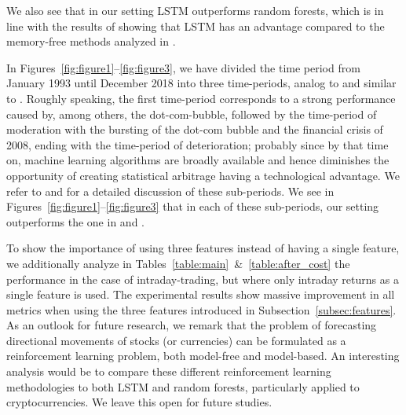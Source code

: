 \documentclass[review]{elsarticle}
\begin{document}
We also see that in our setting LSTM outperforms random forests, which is in line with the results of \cite{krauss18} showing that LSTM has an advantage compared to the  memory-free methods analyzed in \cite{krauss17}.

In Figures~\ref{fig:figure1}--\ref{fig:figure3}, we have divided the time period from January 1993 until December 2018 into three time-periods, analog to \cite{krauss18} and similar to \cite{krauss17}. Roughly speaking, the first time-period corresponds to a strong performance caused by, among others, the dot-com-bubble, followed by the time-period of moderation with the bursting of the dot-com bubble and the financial crisis of 2008, ending with the time-period of deterioration; probably since by that time on, machine learning algorithms are broadly available and hence diminishes the opportunity of creating statistical arbitrage having a technological advantage. We refer to \cite{krauss17} and \cite{krauss18} for a detailed discussion of these sub-periods. We see in Figures~\ref{fig:figure1}--\ref{fig:figure3} that in each of these sub-periods, our setting outperforms the one in \cite{krauss17} and \cite{krauss18}.


To show the importance of using three features instead of having a single feature, we additionally analyze in Tables~\ref{table:main}~\&~\ref{table:after_cost} the performance in the case of intraday-trading, but where only intraday returns  as a single feature is used.  
The experimental results show massive improvement in all metrics when using the three features introduced in Subsection~\ref{subsec:features}.
\\

As an outlook for future research, we remark  that the problem of forecasting directional movements of stocks (or currencies)  can be formulated as a reinforcement learning problem, both model-free and model-based. An interesting analysis would be to compare these different reinforcement learning methodologies to both LSTM and random forests, particularly applied to cryptocurrencies. We leave this open for future studies.
\end{document}
